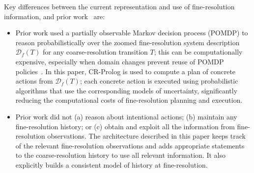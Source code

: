 \documentclass[letterpaper, 10 pt, conference]{article}  %
\begin{document}
Key differences between the current representation and use of
fine-resolution information, and prior
work~\cite{sridharan2017refinement} are:
\begin{itemize}
\item Prior work used a partially observable Markov decision process
  (POMDP) to reason probabilistically over the zoomed fine-resolution
  system description $\mathcal{D}_f(T)$ for any coarse-resolution
  transition $T$; this can be computationally expensive, especially
  when domain changes prevent reuse of POMDP
  policies~\cite{sridharan2017refinement}. In this paper, CR-Prolog is
  used to compute a plan of concrete actions from $\mathcal{D}_f(T)$;
  each concrete action is executed using probabilistic algorithms that
  use the corresponding models of uncertainty, significantly reducing
  the computational costs of fine-resolution planning and execution.

\item Prior work did not (a) reason about intentional actions; (b)
  maintain any fine-resolution history; or (c) obtain and exploit all
  the information from fine-resolution observations. The architecture
  described in this paper keeps track of the relevant fine-resolution
  observations and adds appropriate statements to the
  coarse-resolution history to use all relevant information. It also
  explicitly builds a consistent model of history at fine-resolution.
\end{itemize}


\end{document}
